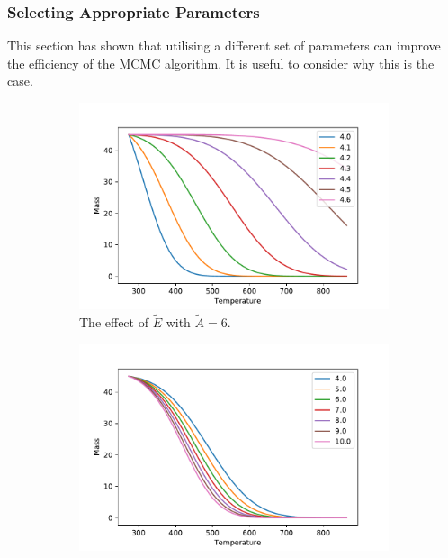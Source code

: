 \subsubsection{Selecting Appropriate Parameters}
This section has shown that utilising a different set of parameters can improve the efficiency of the MCMC algorithm. It is useful to consider why this is the case.\\ 
\begin{figure}[h!]
\centering
\begin{subfigure}{.5\textwidth}
  \centering
  \includegraphics[width=\linewidth]{figures/bayesian/1_reaction/E_A_fwc.pdf}
  \caption{The effect of $\tilde{E}$ with $\tilde{A}=6$.}
  \label{fig:subfwc_E_A}
\end{subfigure}%
\begin{subfigure}{.5\textwidth}
  \centering
  \includegraphics[width=\linewidth]{figures/bayesian/1_reaction/A_fwc.pdf}

\end{subfigure}
\end{figure}
